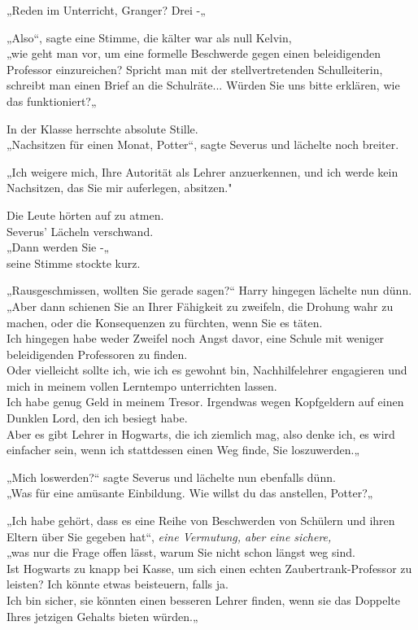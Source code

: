 {„Reden im Unterricht, Granger? Drei -„

„Also“, sagte eine Stimme, die kälter war als null Kelvin,\\ „wie geht man vor, um eine formelle Beschwerde gegen einen beleidigenden Professor einzureichen? Spricht man mit der stellvertretenden Schulleiterin, schreibt man einen Brief an die Schulräte... Würden Sie uns bitte erklären, wie das funktioniert?„

In der Klasse herrschte absolute Stille.\\ „Nachsitzen für einen Monat, Potter“, sagte Severus und lächelte noch breiter.

„Ich weigere mich, Ihre Autorität als Lehrer anzuerkennen, und ich werde kein Nachsitzen, das Sie mir auferlegen, absitzen."

Die Leute hörten auf zu atmen.\\ Severus' Lächeln verschwand.\\ „Dann werden Sie -„\\ seine Stimme stockte kurz.

„Rausgeschmissen, wollten Sie gerade sagen?“ Harry hingegen lächelte nun dünn.\\ „Aber dann schienen Sie an Ihrer Fähigkeit zu zweifeln, die Drohung wahr zu machen, oder die Konsequenzen zu fürchten, wenn Sie es täten.\\ Ich hingegen habe weder Zweifel noch Angst davor, eine Schule mit weniger beleidigenden Professoren zu finden.\\ Oder vielleicht sollte ich, wie ich es gewohnt bin, Nachhilfelehrer engagieren und mich in meinem vollen Lerntempo unterrichten lassen.\\ Ich habe genug Geld in meinem Tresor. Irgendwas wegen Kopfgeldern auf einen Dunklen Lord, den ich besiegt habe.\\ Aber es gibt Lehrer in Hogwarts, die ich ziemlich mag, also denke ich, es wird einfacher sein, wenn ich stattdessen einen Weg finde, Sie loszuwerden.„

„Mich loswerden?“ sagte Severus und lächelte nun ebenfalls dünn.\\ „Was für eine amüsante Einbildung. Wie willst du das anstellen, Potter?„

„Ich habe gehört, dass es eine Reihe von Beschwerden von Schülern und ihren Eltern über Sie gegeben hat“, \emph{eine Vermutung, aber eine sichere,}\\ „was nur die Frage offen lässt, warum Sie nicht schon längst weg sind.\\ Ist Hogwarts zu knapp bei Kasse, um sich einen echten Zaubertrank-Professor zu leisten? Ich könnte etwas beisteuern, falls ja.\\ Ich bin sicher, sie könnten einen besseren Lehrer finden, wenn sie das Doppelte Ihres jetzigen Gehalts bieten würden.„

}
